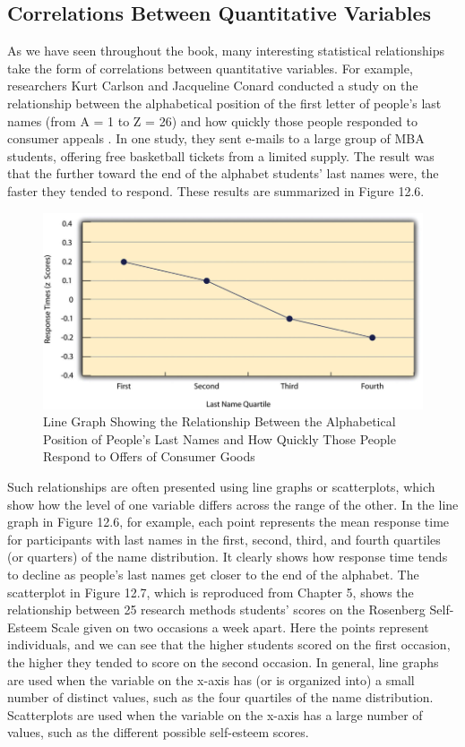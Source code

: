 \subsection{Correlations Between Quantitative Variables}

As we have seen throughout the book, many interesting statistical relationships take the form of correlations between quantitative variables. For example, researchers Kurt Carlson and Jacqueline Conard conducted a study on the relationship between the alphabetical position of the first letter of people's last names (from A = 1 to Z = 26) and how quickly those people responded to consumer appeals \citep{carlson_last_2011}. In one study, they sent e-mails to a large group of MBA students, offering free basketball tickets from a limited supply. The result was that the further toward the end of the alphabet students' last names were, the faster they tended to respond. These results are summarized in Figure 12.6.


\begin{figure}
\includegraphics[width=.7\linewidth]{figures/Fig12-6}
\caption{Line Graph Showing the Relationship Between the Alphabetical Position of People's Last Names and How Quickly Those People Respond to Offers of Consumer Goods}
\label{fig:line}
\end{figure}

Such relationships are often presented using line graphs or scatterplots, which show how the level of one variable differs across the range of the other. In the line graph in Figure 12.6, for example, each point represents the mean response time for participants with last names in the first, second, third, and fourth quartiles (or quarters) of the name distribution. It clearly shows how response time tends to decline as people's last names get closer to the end of the alphabet. The scatterplot in Figure 12.7, which is reproduced from Chapter 5, shows the relationship between 25 research methods students' scores on the Rosenberg Self-Esteem Scale given on two occasions a week apart. Here the points represent individuals, and we can see that the higher students scored on the first occasion, the higher they tended to score on the second occasion. In general, line graphs are used when the variable on the x-axis has (or is organized into) a small number of distinct values, such as the four quartiles of the name distribution. Scatterplots are used when the variable on the x-axis has a large number of values, such as the different possible self-esteem scores.

